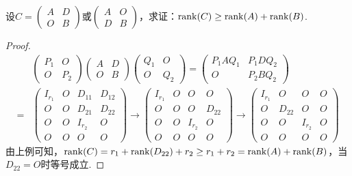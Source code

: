 \begin{example}
  设\( C=\left(\begin{smallmatrix}
      A & D \\
      O & B \end{smallmatrix}\right)\)或\( \left(\begin{smallmatrix}
      A & O \\
      D & B \end{smallmatrix}\right)\)，求证：\(\operatorname{rank}(C) \geq \operatorname{rank}(A)+\operatorname{rank}(B)\).
\end{example}

\begin{proof}
  \begin{align*} & \begin{pmatrix}
      P_1 & O \\
      O & P_2 \end{pmatrix}\begin{pmatrix}
      A & D \\
      O & B \end{pmatrix}\begin{pmatrix}
      Q_1 & O \\
      O & Q_2 \end{pmatrix}= \begin{pmatrix}
      P_1AQ_1 & P_1DQ_2 \\
      O & P_2BQ_2 \end{pmatrix} \\
    = & \begin{pmatrix}
      I_{r_{1}} & O & D_{11} & D_{12}\\
      O & O & D_{21} & D_{22}\\
      O & O & I_{r_2} & O\\
      O & O & O & O\end{pmatrix}\longrightarrow \begin{pmatrix}
      I_{r_{1}} & O & O & O\\
      O & O & O & D_{22}\\
      O & O & I_{r_2} & O\\
      O & O & O & O\end{pmatrix} \longrightarrow \begin{pmatrix}
      I_{r_{1}} & O & O & O\\
      O & D_{22} & O & O\\
      O & O & I_{r_2} & O\\
      O & O & O & O\end{pmatrix}\end{align*}
  由上例可知，\(\operatorname{rank}(C)=r_1+\operatorname{rank}(D_{22})+r_2\geq r_1+r_2=\operatorname{rank}(A)+\operatorname{rank}(B)\)，当\(D_{22}=O\)时等号成立.
\end{proof}


